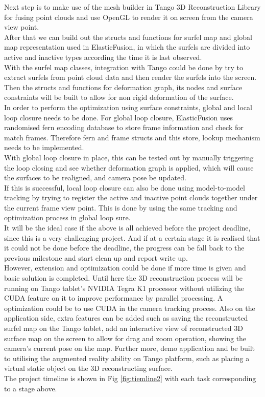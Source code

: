 \documentclass[12pt,twoside]{article}
\begin{document}
Next step is to make use of the mesh builder in Tango 3D Reconstruction Library for fusing point clouds and use OpenGL to render it on screen from the camera view point.\\
After that we can build out the structs and functions for surfel map and global map representation used in ElasticFusion\cite{whelan2015elasticfusion}, in which the surfels are divided into active and inactive types according the time it is last observed.\\
With the surfel map classes, integration with Tango could be done by try to extract surfels from point cloud data and then render the surfels into the screen.\\
Then the structs and functions for deformation graph, its nodes and surface constraints will be built to allow for non rigid deformation of the surface.\\
In order to perform the optimization using surface constraints, global and local loop closure needs to be done. For global loop closure, ElasticFusion\cite{whelan2015elasticfusion} uses randomised fern encoding database to store frame information and check for match frames. Therefore fern and frame structs and this store, lookup mechanism needs to be implemented.\\
With global loop closure in place, this can be tested out by manually triggering the loop closing and see whether deformation graph is applied, which will cause the surfaces to be realigned, and camera pose be updated.\\
If this is successful, local loop closure can also be done using model-to-model tracking by trying to register the active and inactive point clouds together under the current frame view point. This is done by using the same tracking and optimization process in global loop sure.\\
It will be the ideal case if the above is all achieved before the project deadline, since this is a very challenging project. And if at a certain stage it is realised that it could not be done before the deadline, the progress can be fall back to the previous milestone and start clean up and report write up.\\ 
However, extension and optimization could be done if more time is given and basic solution is completed. Until here the 3D reconstruction process will be running on Tango tablet's NVIDIA Tegra K1 processor without utilizing the CUDA feature on it to improve performance by parallel processing. A optimization could be to use CUDA in the camera tracking process. Also on the application side, extra features can be added such as saving the reconstructed surfel map on the Tango tablet, add an interactive view of reconstructed 3D surface map on the screen to allow for drag and zoom operation, showing the camera's current pose on the map. Further more, demo application and be built to utilising the augmented reality ability on Tango platform, such as placing a virtual static object on the 3D reconstructing surface.\\
The project timeline is shown in Fig \ref{fig:tiemline2} with each task corresponding to a stage above.
\end{document}
